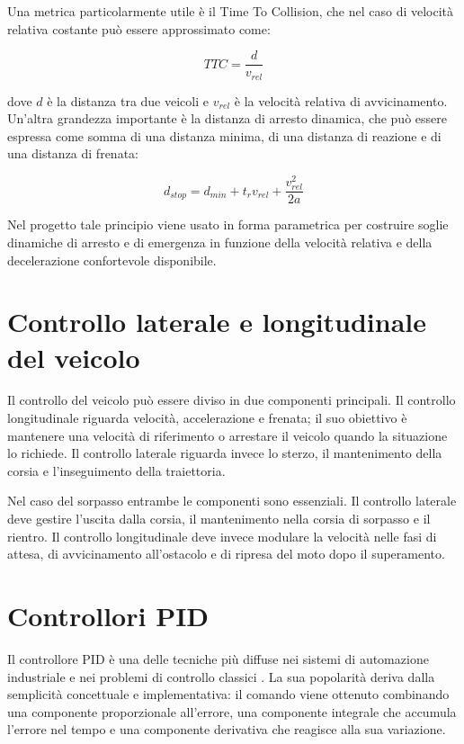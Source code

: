 Una metrica particolarmente utile è il Time To Collision, che nel caso di velocità relativa costante può essere approssimato come:

\[
TTC = \frac{d}{v_{rel}}
\]

dove \(d\) è la distanza tra due veicoli e \(v_{rel}\) è la velocità relativa di avvicinamento. Un'altra grandezza importante è la distanza di arresto dinamica, che può essere espressa come somma di una distanza minima, di una distanza di reazione e di una distanza di frenata:

\[
d_{stop} = d_{min} + t_r v_{rel} + \frac{v_{rel}^2}{2a}
\]

Nel progetto tale principio viene usato in forma parametrica per costruire soglie dinamiche di arresto e di emergenza in funzione della velocità relativa e della decelerazione confortevole disponibile.

\section{Controllo laterale e longitudinale del veicolo}

Il controllo del veicolo può essere diviso in due componenti principali. Il controllo longitudinale riguarda velocità, accelerazione e frenata; il suo obiettivo è mantenere una velocità di riferimento o arrestare il veicolo quando la situazione lo richiede. Il controllo laterale riguarda invece lo sterzo, il mantenimento della corsia e l'inseguimento della traiettoria.

Nel caso del sorpasso entrambe le componenti sono essenziali. Il controllo laterale deve gestire l'uscita dalla corsia, il mantenimento nella corsia di sorpasso e il rientro. Il controllo longitudinale deve invece modulare la velocità nelle fasi di attesa, di avvicinamento all'ostacolo e di ripresa del moto dopo il superamento.

\section{Controllori PID}

Il controllore PID è una delle tecniche più diffuse nei sistemi di automazione industriale e nei problemi di controllo classici \cite{astrom1995pid}. La sua popolarità deriva dalla semplicità concettuale e implementativa: il comando viene ottenuto combinando una componente proporzionale all'errore, una componente integrale che accumula l'errore nel tempo e una componente derivativa che reagisce alla sua variazione.

